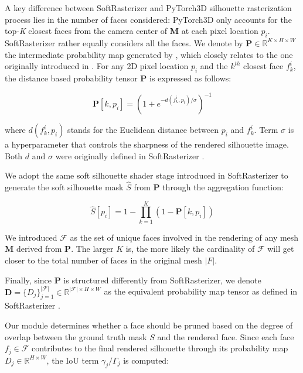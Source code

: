 A key difference between SoftRasterizer and PyTorch3D silhouette rasterization process lies in the number of faces considered: PyTorch3D only accounts for the top-\textit{K} closest faces from the camera center of \textbf{M} at each pixel location $p_i$. SoftRasterizer rather equally considers all the faces. 
We denote by $\mathbf{P}\in \mathbb{R}^{K \times H \times W}$ the intermediate probability map generated by \citep{ravi2020accelarating}, which closely relates to the one originally introduced in \citep{liu2019soft}. For any 2D pixel location $p_{i}$ and the $k^{th}$ closest face $f_{k}^{i}$, the distance based probability tensor $\mathbf{P}$ is expressed as follows:

\begin{equation}
    \mathbf{P}[k,p_{i}]=\left(1+e^{-d(f_{k}^{i},p_{i})/\sigma}\right)^{-1} 
\end{equation}

\noindent where $d(f_{k}^{i},p_{i})$ stands for the Euclidean distance between $p_i$ and $f_{k}^{i}$. Term $\sigma$ is a hyperparameter that controls the sharpness of the rendered silhouette image. Both $d$ and $\sigma$ were originally defined in SoftRasterizer \citep{liu2019soft}. \newline

We adopt the same soft silhouette shader stage introduced in SoftRasterizer to generate the soft silhouette mask $\hat{S}$ from $\mathbf{P}$ through the aggregation function:

\begin{equation}
    \hat{S}[p_i]=1 - \prod_{k=1}^{K} (1 - \mathbf{P}[k,p_{i}])
\end{equation}

We introduced $\mathcal{F}$ as the set of unique faces involved in the rendering of any mesh $\mathbf{M}$ derived from $\mathbf{P}$. The larger $K$ is, the more likely the cardinality of $\mathcal{F}$ will get closer to the total number of faces in the original mesh $|F|$. 

Finally, since $\mathbf{P}$ is structured differently from SoftRasterizer, we denote $\mathbf{D}=\{D_{j}\}_{j=1}^{|\mathcal{F}|}\in \mathbb{R}^{|\mathcal{F}|\times H\times W}$  as the equivalent probability map tensor as defined in SoftRasterizer \citep{liu2019soft}.

Our module determines whether a face should be pruned based on the degree of overlap between the ground truth mask $S$ and the rendered face. Since each face $f_{j} \in \mathcal{F}$ contributes to the final rendered silhouette through its probability map $D_{j}\in \mathbb{R}^{H\times W}$, the \ac{IoU} term $\gamma_{j}/\Gamma_{j}$ is computed: 

